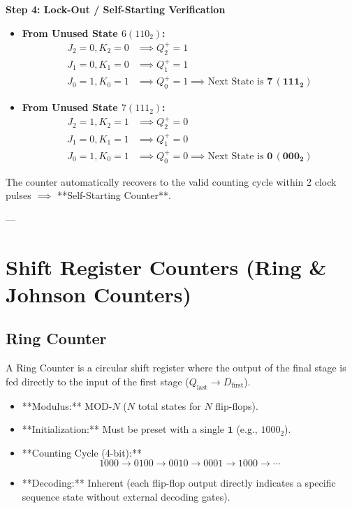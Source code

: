 \begin{example}
\textbf{Step 4: Lock-Out / Self-Starting Verification}
\begin{itemize}
    \item \textbf{From Unused State $6 (110_2)$:}
    \begin{align*}
        J_2=0, K_2=0 &\implies Q_2^+ = 1 \\
        J_1=0, K_1=0 &\implies Q_1^+ = 1 \\
        J_0=1, K_0=1 &\implies Q_0^+ = 1 \implies \text{Next State is } \mathbf{7 \, (111_2)}
    \end{align*}
    \item \textbf{From Unused State $7 (111_2)$:}
    \begin{align*}
        J_2=1, K_2=1 &\implies Q_2^+ = 0 \\
        J_1=0, K_1=1 &\implies Q_1^+ = 0 \\
        J_0=1, K_0=1 &\implies Q_0^+ = 0 \implies \text{Next State is } \mathbf{0 \, (000_2)}
    \end{align*}
\end{itemize}
The counter automatically recovers to the valid counting cycle within 2 clock pulses $\implies$ **Self-Starting Counter**.
\end{example}

---

\section{Shift Register Counters (Ring \& Johnson Counters)}

\subsection{Ring Counter}
A Ring Counter is a circular shift register where the output of the final stage is fed directly to the input of the first stage ($Q_{\text{last}} \rightarrow D_{\text{first}}$).
\begin{itemize}
    \item **Modulus:** $\text{MOD-}N$ ($N$ total states for $N$ flip-flops).
    \item **Initialization:** Must be preset with a single $\mathbf{1}$ (e.g., $1000_2$).
    \item **Counting Cycle (4-bit):**
    \begin{equation}
        1000 \longrightarrow 0100 \longrightarrow 0010 \longrightarrow 0001 \longrightarrow 1000 \longrightarrow \cdots
    \end{equation}
    \item **Decoding:** Inherent (each flip-flop output directly indicates a specific sequence state without external decoding gates).
\end{itemize}


